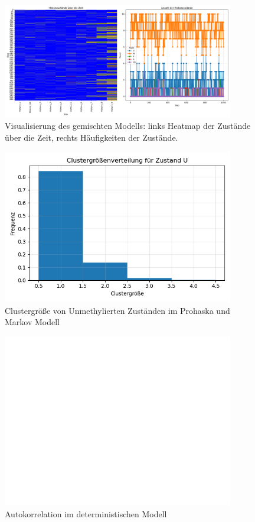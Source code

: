 \documentclass{SeminarV2}
\begin{document}
\begin{figure}[htbp]
  \centering
  \includegraphics[width=0.9\textwidth]{images/Histone_Prohaska_and_Markov_1000.png}
  \caption{Visualisierung des gemischten Modells: links Heatmap der Zustände über die Zeit, rechts Häufigkeiten der Zustände.}
  \label{fig:PM_1000}
\end{figure}

\begin{figure} [htbp]
  \centering
  \includegraphics[width=0.9\textwidth]{images/Histone_Prohaska_and_Markov_1000_cluster.png}
  \caption{Clustergröße von Unmethylierten Zuständen im Prohaska und Markov Modell}
  \label{fig:PM_1000_C}
  \end{figure}

\begin{figure}
  \centering
  \includegraphics[width=0.9\textwidth]{images/Histone_Prohaska_and_Markov_1000_autocor.png}
  \caption{Autokorrelation im deterministischen Modell}
  \label{fig:PM_1000_A}
\end{figure}


\begin{footnotesize}
\newpage


\end{footnotesize}
\end{document}
